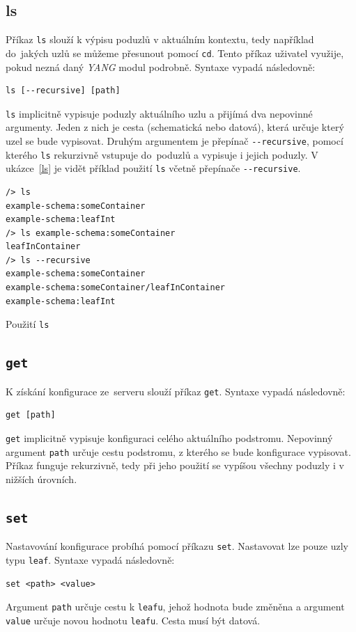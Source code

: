 \documentclass[thesis=B,czech,hidelinks]{FITthesis}[2019/03/06]
\begin{document}
\subsection{ls}
Příkaz \texttt{ls} slouží k výpisu poduzlů v aktuálním kontextu, tedy například do~jakých uzlů se můžeme přesunout pomocí \texttt{cd}. Tento příkaz uživatel využije, pokud nezná daný \textit{YANG} modul podrobně. Syntaxe vypadá následovně:
\begin{verbatim}
ls [--recursive] [path]
\end{verbatim}
\texttt{ls} implicitně vypisuje poduzly aktuálního uzlu a přijímá dva nepovinné argumenty. Jeden z nich je cesta (schematická nebo datová), která určuje který uzel se bude vypisovat. Druhým argumentem je přepínač \verb¨--recursive¨, pomocí kterého \texttt{ls} rekurzivně vstupuje do~poduzlů a vypisuje i jejich poduzly. V ukázce~\ref{ls} je vidět příklad použití \texttt{ls} včetně přepínače \verb¨--recursive¨.

\begin{listing}[H]
\begin{verbatim}
/> ls
example-schema:someContainer
example-schema:leafInt
/> ls example-schema:someContainer
leafInContainer
/> ls --recursive
example-schema:someContainer
example-schema:someContainer/leafInContainer
example-schema:leafInt
\end{verbatim}
\caption{Použití \texttt{ls}}\label{ls}
\end{listing}
\subsection{\texttt{get}}

K získání konfigurace ze~serveru slouží příkaz \texttt{get}. Syntaxe vypadá následovně:
\begin{verbatim}
get [path]
\end{verbatim}
\texttt{get} implicitně vypisuje konfiguraci celého aktuálního podstromu. Nepovinný argument \texttt{path} určuje cestu podstromu, z kterého se bude konfigurace vypisovat. Příkaz funguje rekurzivně, tedy při jeho použití se vypíšou všechny poduzly i v nižších úrovních.

\subsection{\texttt{set}}
Nastavování konfigurace probíhá pomocí příkazu \texttt{set}. Nastavovat lze pouze uzly typu \texttt{leaf}. Syntaxe vypadá následovně:
\begin{verbatim}
set <path> <value>
\end{verbatim}
Argument \texttt{path} určuje cestu k \texttt{leafu}, jehož hodnota bude změněna a argument \texttt{value} určuje novou hodnotu \texttt{leafu}. Cesta musí být datová.
\end{document}
